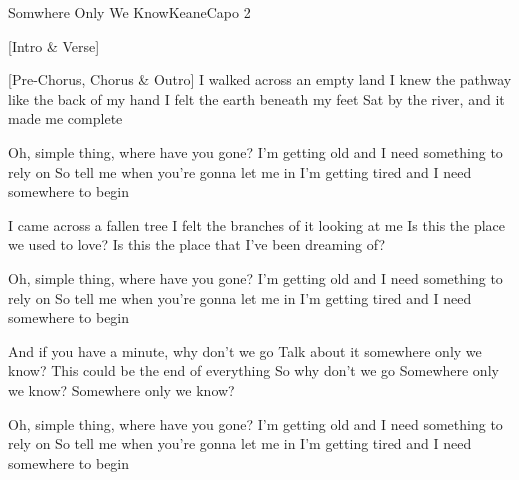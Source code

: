 \begin{song}{Somwhere Only We Know}{Keane}{Capo 2}

[Intro & Verse]

[Pre-Chorus, Chorus & Outro]
I walked across an empty land
I knew the pathway like the back of my hand
I felt the earth beneath my feet
Sat by the river, and it made me complete

Oh, simple thing, where have you gone?
I'm getting old and I need something to rely on
So tell me when you're gonna let me in
I'm getting tired and I need somewhere to begin

I came across a fallen tree
I felt the branches of it looking at me
Is this the place we used to love?
Is this the place that I've been dreaming of?

Oh, simple thing, where have you gone?
I'm getting old and I need something to rely on
So tell me when you're gonna let me in
I'm getting tired and I need somewhere to begin

\newpage
{}
And if you have a minute, why don't we go
Talk about it somewhere only we know?
This could be the end of everything
So why don't we go
Somewhere only we know?
Somewhere only we know?

Oh, simple thing, where have you gone?
I'm getting old and I need something to rely on
So tell me when you're gonna let me in
I'm getting tired and I need somewhere to begin


\end{song}
